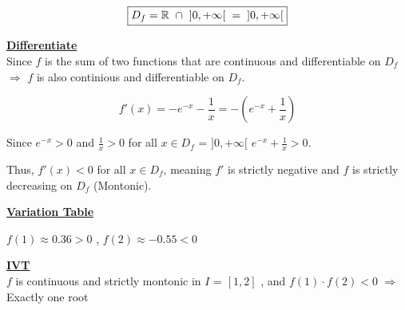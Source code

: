 \[\boxed{D_{f} = \mathbb{R}\hspace{0.2cm}\cap\hspace{0.2cm}]0,+\infty[\hspace{0.2cm}=\hspace{0.2cm}]0,+\infty[}\]

\vspace{0.5cm}

\textbf{\underline{Differentiate}}\\[0.2cm]
Since \( f \) is the sum of two functions that are continuous and differentiable on \( D_f \) \(\Rightarrow\) \( f \) is also continious and differentiable on \( D_f \).


\[
f'(x) = -e^{-x} - \frac{1}{x} = -(e^{-x} + \frac{1}{x})
\]

\vspace{0.5cm}

Since \hspace{0.2cm}\( e^{-x} > 0 \) \hspace{0.2cm} and \hspace{0.2cm}\( \frac{1}{x} > 0 \) \hspace{0.2cm}for all \hspace{0.2cm}\( x \in D_f\) = \(]0, +\infty[ \)\hspace{0.2cm} \Rightarrow  \hspace{0.2cm}\( e^{-x} + \frac{1}{x} > 0 \).  

\vspace{0.2cm}

Thus, \( f'(x) < 0 \) for all \( x \in D_f \), meaning \( f' \) is strictly negative and \( f \) is strictly decreasing on \( D_f \) (Montonic).

\vspace{1cm}

\textbf{\underline{Variation Table}}\\[0.25cm]

\begin{center}
\end{center}

\vspace{0.5cm}
\(f(1) \approx 0.36 > 0 \) , \(f(2) \approx -0.55 < 0\)

\vspace{1cm}
\textbf{\underline{IVT}}\\[0.25cm]
\(f\) is continuous and strictly montonic in \(I\) = \([1,2]\) , and \(f(1)\cdot f(2) < 0\) \(\Rightarrow\) Exactly one root

